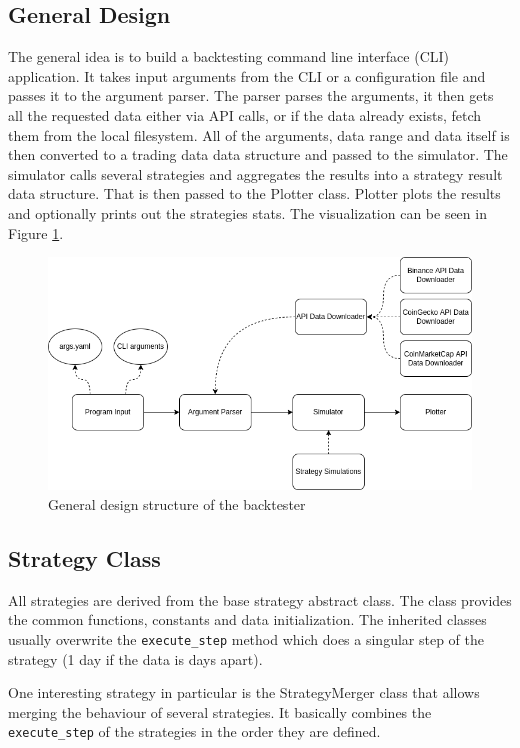 \subsection*{General Design}
The general idea is to build a backtesting command line interface (CLI) application. It takes input arguments from the CLI or a configuration file and passes it to the argument parser. The parser parses the arguments, it then gets all the requested data either via API calls, or if the data already exists, fetch them from the local filesystem. All of the arguments, data range and data itself is then converted to a trading data data structure and passed to the simulator. The simulator calls several strategies and aggregates the results into a strategy result data structure. That is then passed to the Plotter class. Plotter plots the results and optionally prints out the strategies stats. The visualization can be seen in Figure \ref{structure-diagram}.

\begin{figure}[ht]
    \centering
    \includegraphics[width=\columnwidth]{figures/structure-diagram.png}
    \caption{General design structure of the backtester}
    \label{structure-diagram}
\end{figure}

\subsection*{Strategy Class}
All strategies are derived from the base strategy abstract class. The class provides the common functions, constants and data initialization. The inherited classes usually overwrite the \texttt{execute\_step} method which does a singular step of the strategy (1 day if the data is days apart).

One interesting strategy in particular is the StrategyMerger class that allows merging the behaviour of several strategies. It basically combines the \texttt{execute\_step} of the strategies in the order they are defined.

